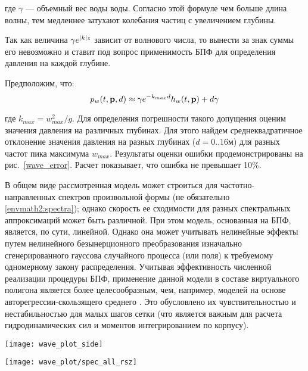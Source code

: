 где $\gamma$ --- объемный вес воды воды. Согласно этой формуле чем больше длина волны, тем медленнее затухают колебания частиц с увеличением глубины.

Так как величина $\gamma e^{\lvert k\rvert z}$ зависит от волнового числа, то вынести за знак суммы его невозможно и ставит под вопрос применимость БПФ для определения давления на каждой глубине.

Предположим, что:
\begin{equation}
\label{wave_height}
	p_w(t,\mathbf{p},d) \approx
		\gamma e^{-k_{max}d} h_w(t,\mathbf{p}) + d \gamma
\end{equation}

где $k_{max} = w_{max}^{2} / g$. Для определения погрешности такого допущения оценим значения давления на различных глубинах. Для этого найдем среднеквадратичное отклонение значения давления на разных глубинах
 ($d=0..16 \text{м}$) для разных частот пика максимума $w_{max}$. Результаты оценки ошибки продемонстрированы на рис.~\ref{wave_error}. Расчет показывает, что ошибка не превышает 10\%. 

В общем виде рассмотренная модель может строиться для частотно-направленных спектров произвольной формы (не обязательно \eqref{envmath2:spectra}); однако скорость ее сходимости для разных спектральных аппроксимаций может быть различной. При этом модель, основанная на БПФ, является, по сути, линейной. Однако она может учитывать нелинейные эффекты путем нелинейного безынерционного преобразования изначально сгенерированного гауссова случайного процесса (или поля) к требуемому одномерному закону распределения. Учитывая эффективность численной реализации процедуры БПФ, применение данной модели в составе виртуального полигона является более целесообразным, чем, например, моделей на основе авторегрессии-скользящего среднего \citep{dk8}. Это обусловлено их чувствительностью и нестабильностью для малых шагов сетки (что является важным для расчета гидродинамических сил и моментов интегрированием по корпусу). 

\begin{sidewaysfigure}
	\texttt{[image: wave\_plot\_side]}
	\caption{Оценка ошибки расчета давления приближенным способом: (a) --- профиль поверхностей равного давления при точном расчете; (б) --- профиль поверхностей равного давления при приближенном расчете; (в) --- стандартное отклонение ошибки расчета давления на разных глубинах, для разных частот пика максимума; (г) --- относительная ошибка расчета давления на разных глубинах, для разных частот пика максимума.}
	\label{wave_error}
\end{sidewaysfigure}



\begin{sidewaysfigure}
\begin{center}
	\texttt{[image: wave\_plot/spec\_all\_rsz]}
\end{center}
\caption{Планшеты ядра БПФ и карт высот морского волнения для различных значение параметра формы углового распределения}
\label{waveplot}
\end{sidewaysfigure}


